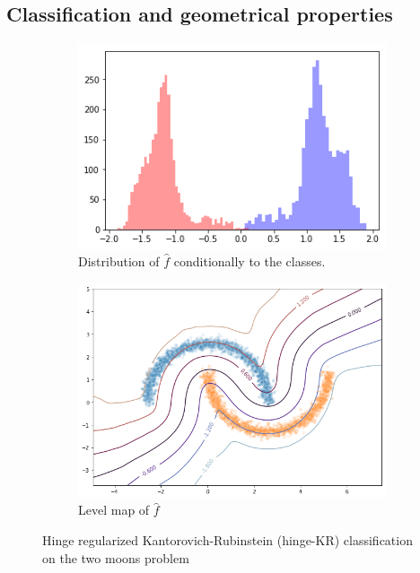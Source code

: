 \documentclass{article}
\begin{document}
\subsection{Classification and geometrical properties}
\label{sec:khr_properties}

\begin{figure}
\centering
\begin{subfigure}{.5\textwidth}
  \centering
  \includegraphics[width=1\linewidth]{img/wass_reg_2moons_dist.png}
  \caption{Distribution of $\hat{f}$ conditionally to the classes.}
  \label{wass_pen:sub1}
\end{subfigure}%
\begin{subfigure}{.5\textwidth}
  \centering
  \includegraphics[width=1\linewidth]{img/wass_reg_2moons_class.png}
  \caption{Level map of $\hat{f}$}
  \label{wass_pen:sub2}
\end{subfigure}
\caption{Hinge regularized Kantorovich-Rubinstein (hinge-KR) classification on the two moons problem}
\label{fig:wass_pen}
\end{figure}
\end{document}
